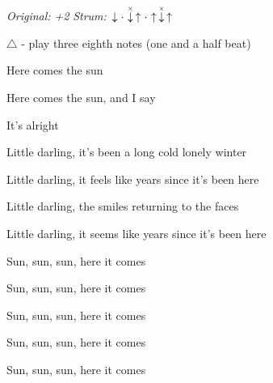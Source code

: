 \begin{song}


\begin{headerbox}
\RaiseBoxWithChucks
{} \quad
\textit{Original: +2} \quad
\textit{Strum:} $\Down\Miss\ChuckDown\Up\Miss\Up\ChuckDown\Up$
\end{headerbox}

\begin{hchordbox}
\end{hchordbox}

\Large

\bigskip

{
\smaller $\triangle$ - play three eighth notes (one and a half beat)
}

\bigskip

\begin{chorusbox}{\Chorus}
 Here comes the sun  \par
{} Here comes the sun, and I say \par
{} It's alright   \par
{}  \par
\end{chorusbox}

\bigskip

 Little darling, it's been a long cold lonely winter \par
{} Little darling, it feels like years since it's been here \par

\bigskip

\Chorus

\bigskip

 Little darling, the smiles returning to the faces \par
{} Little darling, it seems like years since it's been here \par

\bigskip

\Chorus

\bigskip

Sun, sun, sun, here it comes  \par
{}Sun, sun, sun, here it comes  \par
{}Sun, sun, sun, here it comes  \par
{}Sun, sun, sun, here it comes  \par
{}Sun, sun, sun, here it comes \par
{}    \par


\end{song}
